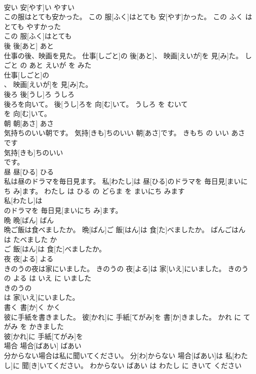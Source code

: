 \documentclass[8pt]{extreport}
\begin{document}
\begin{CJK}{UTF8}{min}
\\	安い	安[やす]い	やすい	
\\	この服はとても安かった。	この 服[ふく]はとても 安[やす]かった。	この ふく は とても やすかった	
\\	この 服[ふく]はとても
\\	後	後[あと]	あと	
\\	仕事の後、映画を見た。	仕事[しごと]の 後[あと]、 映画[えいが]を 見[み]た。	しごと の あと えいが を みた	
\\	仕事[しごと]の
\\	、 映画[えいが]を 見[み]た。			
\\	後ろ	後[うし]ろ	うしろ	
\\	後ろを向いて。	後[うし]ろを 向[む]いて。	うしろ を むいて	
\\	を 向[む]いて。			
\\	朝	朝[あさ]	あさ	
\\	気持ちのいい朝です。	気持[きも]ちのいい 朝[あさ]です。	きもち の いい あさ です	
\\	気持[きも]ちのいい
\\	です。			
\\	昼	昼[ひる]	ひる	
\\	私は昼のドラマを毎日見ます。	私[わたし]は 昼[ひる]のドラマを 毎日見[まいにち み]ます。	わたし は ひる の どらま を まいにち みます	
\\	私[わたし]は
\\	のドラマを 毎日見[まいにち み]ます。			
\\	晩	晩[ばん]	ばん	
\\	晩ご飯は食べましたか。	晩[ばん]ご 飯[はん]は 食[た]べましたか。	ばんごはん は たべました か	
\\	ご 飯[はん]は 食[た]べましたか。			
\\	夜	夜[よる]	よる	
\\	きのうの夜は家にいました。	きのうの 夜[よる]は 家[いえ]にいました。	きのう の よる は いえ に いました	
\\	きのうの
\\	は 家[いえ]にいました。			
\\	書く	書[か]く	かく	
\\	彼に手紙を書きました。	彼[かれ]に 手紙[てがみ]を 書[か]きました。	かれ に てがみ を かきました	
\\	彼[かれ]に 手紙[てがみ]を
\\	場合	場合[ばあい]	ばあい	
\\	分からない場合は私に聞いてください。	分[わ]からない 場合[ばあい]は 私[わたし]に 聞[き]いてください。	わからない ばあい は わたし に きいて ください	

\end{CJK}
\end{document}
